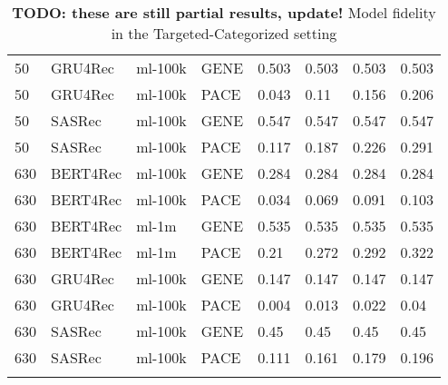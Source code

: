 \begin{longtable}{|l|l|l|l|l|l|l|l|}
50 & GRU4Rec & ml-100k & GENE & 0.503 & 0.503 & 0.503 & 0.503 \\
50 & GRU4Rec & ml-100k & PACE & 0.043 & 0.11 & 0.156 & 0.206 \\\hline
50 & SASRec & ml-100k & GENE & 0.547 & 0.547 & 0.547 & 0.547 \\
50 & SASRec & ml-100k & PACE & 0.117 & 0.187 & 0.226 & 0.291 \\\hline
630 & BERT4Rec & ml-100k & GENE & 0.284 & 0.284 & 0.284 & 0.284 \\
630 & BERT4Rec & ml-100k & PACE & 0.034 & 0.069 & 0.091 & 0.103 \\\hline
630 & BERT4Rec & ml-1m & GENE & 0.535 & 0.535 & 0.535 & 0.535 \\
630 & BERT4Rec & ml-1m & PACE & 0.21 & 0.272 & 0.292 & 0.322 \\\hline
630 & GRU4Rec & ml-100k & GENE & 0.147 & 0.147 & 0.147 & 0.147 \\
630 & GRU4Rec & ml-100k & PACE & 0.004 & 0.013 & 0.022 & 0.04 \\\hline
630 & SASRec & ml-100k & GENE & 0.45 & 0.45 & 0.45 & 0.45 \\
630 & SASRec & ml-100k & PACE & 0.111 & 0.161 & 0.179 & 0.196 \\\hline
\caption{\textbf{TODO: these are still partial results, update!} Model fidelity in the Targeted-Categorized setting}
    \label{tab:eval_targ_cat}
    \end{longtable}
    \endgroup